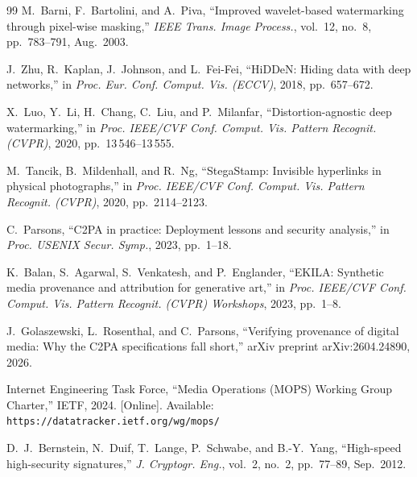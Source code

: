 \documentclass[conference]{IEEEtran}
\begin{document}
\begin{thebibliography}{99}
M.~Barni, F.~Bartolini, and A.~Piva,
``Improved wavelet-based watermarking through pixel-wise masking,''
\textit{IEEE Trans. Image Process.}, vol.~12, no.~8, pp.~783--791, Aug.~2003.

J.~Zhu, R.~Kaplan, J.~Johnson, and L.~Fei-Fei,
``HiDDeN: Hiding data with deep networks,''
in \textit{Proc. Eur. Conf. Comput. Vis. (ECCV)}, 2018, pp.~657--672.

X.~Luo, Y.~Li, H.~Chang, C.~Liu, and P.~Milanfar,
``Distortion-agnostic deep watermarking,''
in \textit{Proc. IEEE/CVF Conf. Comput. Vis. Pattern Recognit. (CVPR)},
2020, pp.~13\,546--13\,555.

M.~Tancik, B.~Mildenhall, and R.~Ng,
``StegaStamp: Invisible hyperlinks in physical photographs,''
in \textit{Proc. IEEE/CVF Conf. Comput. Vis. Pattern Recognit. (CVPR)},
2020, pp.~2114--2123.

C.~Parsons,
``C2PA in practice: Deployment lessons and security analysis,''
in \textit{Proc. USENIX Secur. Symp.}, 2023, pp.~1--18.

K.~Balan, S.~Agarwal, S.~Venkatesh, and P.~Englander,
``EKILA: Synthetic media provenance and attribution for generative art,''
in \textit{Proc. IEEE/CVF Conf. Comput. Vis. Pattern Recognit. (CVPR)
Workshops}, 2023, pp.~1--8.

J.~Golaszewski, L.~Rosenthal, and C.~Parsons,
``Verifying provenance of digital media: Why the C2PA specifications fall
short,'' arXiv preprint arXiv:2604.24890, 2026.

Internet Engineering Task Force,
``Media Operations (MOPS) Working Group Charter,''
IETF, 2024.
[Online]. Available: \texttt{https://datatracker.ietf.org/wg/mops/}

D.~J.~Bernstein, N.~Duif, T.~Lange, P.~Schwabe, and B.-Y.~Yang,
``High-speed high-security signatures,''
\textit{J. Cryptogr. Eng.}, vol.~2, no.~2, pp.~77--89, Sep.~2012.

\end{thebibliography}
\end{document}
